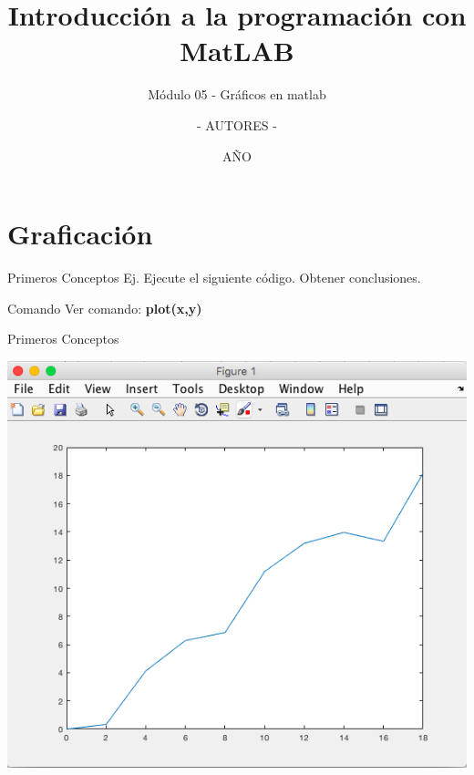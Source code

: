 \documentclass{bredelebeamer}
\title[Programación en MatLAB]{Introducción a la programación con MatLAB}
\subtitle{Módulo 05 - Gráficos en matlab}
\author{- AUTORES - \inst{1}}
\institute[UNIVERSIDAD]
{
  \inst{1}%
  - NOMBRE UNIVERSIDAD - 
  }
\date{AÑO}
\begin{document}
\begin{frame}
  \titlepage 
\end{frame}




\section{Graficación}

\begin{frame}{Primeros Conceptos}
Ej. Ejecute el siguiente código. Obtener conclusiones.

\begin{exampleblock}{Comando}
Ver comando: \textbf{plot(x,y)}
\end{exampleblock}
\end{frame}

\begin{frame}{Primeros Conceptos}
\begin{center}
\includegraphics[scale=0.35]{images/pantalla14.png}
\end{center}
\end{frame}
\end{document}
